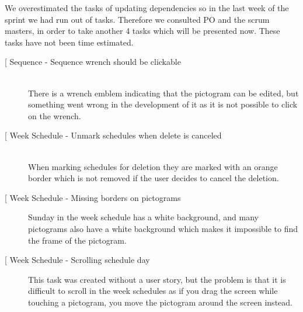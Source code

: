 We overestimated the tasks of updating dependencies so in the last week of the sprint we had run out of tasks.
Therefore we consulted PO and the scrum masters, in order to take another 4 tasks which will be presented now.
These tasks have not been time estimated.

\begin{description}
    \item[{[}\phigh{]} Sequence - Sequence wrench should be clickable] \hfill \\
        There is a wrench emblem indicating that the pictogram can be edited, but something went wrong in the development of it as it is not possible to click on the wrench.
    \item[{[}\phigh{]} Week Schedule - Unmark schedules when delete is canceled] \hfill \\
        When marking schedules for deletion they are marked with an orange border which is not removed if the user decides to cancel the deletion.
    \item[{[}\phigh{]} Week Schedule - Missing borders on pictograms]
        Sunday in the week schedule has a white background, and many pictograms also have a white background which makes it impossible to find the frame of the pictogram.
    \item[{[}\pigh{]} Week Schedule - Scrolling schedule day]
        This task was created without a user story, but the problem is that it is difficult to scroll in the week schedules as if you drag the screen while touching a pictogram, you move the pictogram around the screen instead.
\end{description}